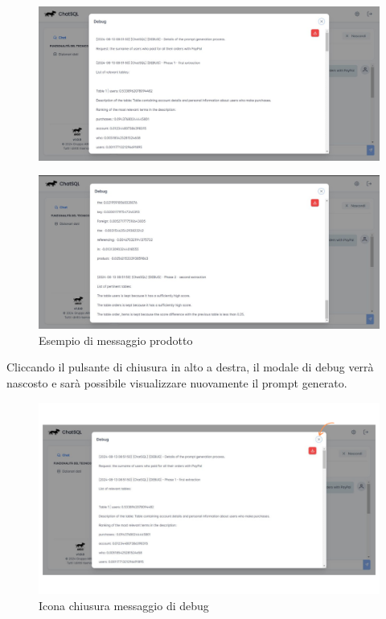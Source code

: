 \begin{figure}[H]
  \centering
  \includegraphics[width=\textwidth]{assets/analisi_debug1.jpg}
\end{figure}

\begin{figure}[H]
  \centering
  \includegraphics[width=\textwidth]{assets/analisi_debug2.jpg}
  \caption{Esempio di messaggio prodotto}
\end{figure}

\par Cliccando il pulsante di chiusura in alto a destra, il modale di debug verrà nascosto e sarà possibile visualizzare nuovamente il prompt generato.
\begin{figure}[H]
  \centering
  \includegraphics[width=\textwidth]{assets/tasto_close_debug.png}
  \caption{Icona chiusura messaggio di debug}
\end{figure}

